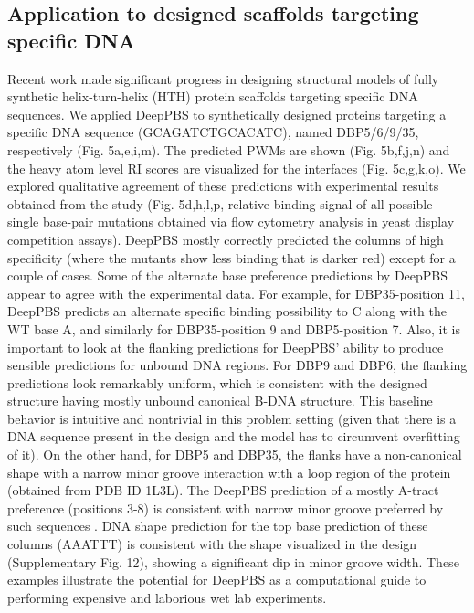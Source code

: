 \subsection{Application to designed scaffolds targeting specific DNA}
Recent work \citep{Glasscock2023} made significant progress in designing structural models of fully synthetic helix-turn-helix (HTH) protein scaffolds targeting specific DNA sequences. We applied DeepPBS to synthetically designed proteins targeting a specific DNA sequence (GCAGATCTGCACATC), named DBP5/6/9/35, respectively (Fig. 5a,e,i,m). The predicted PWMs are shown (Fig. 5b,f,j,n) and the heavy atom level RI scores are visualized for the interfaces (Fig. 5c,g,k,o). We explored qualitative agreement of these predictions with experimental results obtained from the study (Fig. 5d,h,l,p, relative binding signal of all possible single base-pair mutations obtained via flow cytometry analysis \citep{Glasscock2023} in yeast display competition assays). DeepPBS mostly correctly predicted the columns of high specificity (where the mutants show less binding that is darker red) except for a couple of cases. Some of the alternate base preference predictions by DeepPBS appear to agree with the experimental data. For example, for DBP35-position 11, DeepPBS predicts an alternate specific binding possibility to C along with the WT base A, and similarly for DBP35-position 9 and DBP5-position 7. Also, it is important to look at the flanking predictions for DeepPBS’ ability to produce sensible predictions for unbound DNA regions. For DBP9 and DBP6, the flanking predictions look remarkably uniform, which is consistent with the designed structure having mostly unbound canonical B-DNA structure. This baseline behavior is intuitive and nontrivial in this problem setting (given that there is a DNA sequence present in the design and the model has to circumvent overfitting of it). On the other hand, for DBP5 and DBP35, the flanks have a non-canonical shape with a narrow minor groove interaction with a loop region of the protein (obtained from PDB ID 1L3L). The DeepPBS prediction of a mostly A-tract preference (positions 3-8) is consistent with narrow minor groove preferred by such sequences \citep{Stefl2004}. DNA shape prediction \citep{Li2023} for the top base prediction of these columns (AAATTT) is consistent with the shape visualized in the design (Supplementary Fig. 12), showing a significant dip in minor groove width. These examples illustrate the potential for DeepPBS as a computational guide to performing expensive and laborious wet lab experiments.

